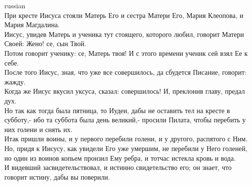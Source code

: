 \documentclass[10pt]{article} %
\begin{document}
{\begin{minipage}[t]{0.48\textwidth}
\begin{otherlanguage*}{russian}
\\
При кресте Иисуса стояли Матерь Его и сестра Матери Его, Мария Клеопова, и Мария Магдалина.
\\
Иисус, увидев Матерь и ученика тут стоящего, которого любил, говорит Матери Своей: Жено! се, сын Твой.
\\
Потом говорит ученику: се, Матерь твоя! И с этого времени ученик сей взял Ее к себе.
\\
После того Иисус, зная, что уже все совершилось, да сбудется Писание, говорит: жажду.
\\
Когда же Иисус вкусил уксуса, сказал: совершилось! И, преклонив главу, предал дух.
\\
Но так как тогда была пятница, то Иудеи, дабы не оставить тел на кресте в субботу,- ибо та суббота была день великий,- просили Пилата, чтобы перебить у них голени и снять их.
\\
Итак пришли воины, и у первого перебили голени, и у другого, распятого с Ним.
\\
Но, придя к Иисусу, как увидели Его уже умершим, не перебили у Него голеней,
\\
но один из воинов копьем пронзил Ему ребра, и тотчас истекла кровь и вода.
\\
И видевший засвидетельствовал, и истинно свидетельство его; он знает, что говорит истину, дабы вы поверили.
\end{otherlanguage*}
\end{minipage}
\hfill
\begin{minipage}[t]{0.5\textwidth}


\end{minipage}}
\end{document}
